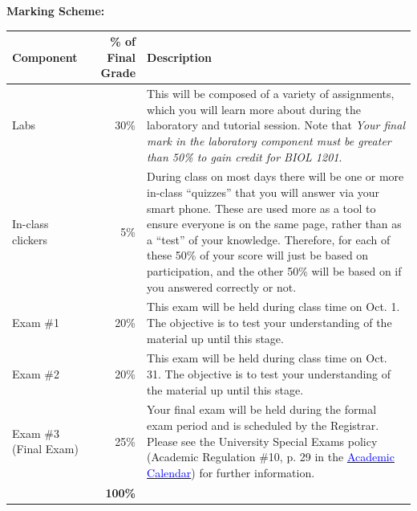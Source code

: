 \documentclass[hidelinks]{article}
\begin{document}
	\textbf{Marking Scheme:}
		\begin{table}[H]
		\centering
			\begin{tabular}{p{2.5cm} r p{10cm}}
				\toprule
				\textbf{Component} & \textbf{\% of Final Grade} & \textbf{Description}\\
				\midrule
				Labs & 30\% & This will be composed of a variety of assignments, which you will learn more about during the laboratory and tutorial session. Note that \emph{Your final mark in the laboratory component must be greater than 50\% to gain credit for BIOL 1201}.\\
				\addlinespace
				In-class clickers & 5\% & During class on most days there will be one or more in-class ``quizzes'' that you will answer via your smart phone. These are used more as a tool to ensure everyone is on the same page, rather than as a ``test'' of your knowledge. Therefore, for each of these 50\% of your score will just be based on participation, and the other 50\% will be based on if you answered correctly or not.\\
				\addlinespace
				Exam \#1 & 20\% & This exam will be held during class time on Oct. 1. The objective is to test your understanding of the material up until this stage.\\
				\addlinespace
				Exam \#2 & 20\% & This exam will be held during class time on Oct. 31. The objective is to test your understanding of the material up until this stage.\\
				\addlinespace
				Exam \#3 (Final Exam) & 25\% & Your final exam will be held during the formal exam period and is scheduled by the Registrar. Please see the University Special Exams policy (Academic Regulation \#10, p. 29 in the \href{https://smu.ca/webfiles/AcademicCalendar2019-2020-Undergraduate.pdf}{\textcolor{blue}{Academic Calendar}}) for further information. \\
				\midrule
				& \textbf{100\%}\\
				\bottomrule
			\end{tabular}
		\end{table}	
		
		
\end{document}
